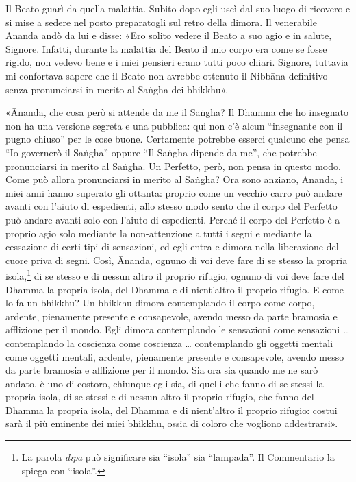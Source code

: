 Il Beato guarì da quella malattia. Subito dopo egli uscì dal suo luogo
di ricovero e si mise a sedere nel posto preparatogli sul retro della
dimora. Il venerabile Ānanda andò da lui e disse: «Ero solito vedere il
Beato a suo agio e in salute, Signore. Infatti, durante la malattia del
Beato il mio corpo era come se fosse rigido, non vedevo bene e i miei
pensieri erano tutti poco chiari. Signore, tuttavia mi confortava sapere
che il Beato non avrebbe ottenuto il Nibbāna definitivo senza
pronunciarsi in merito al Saṅgha dei bhikkhu».


«Ānanda, che cosa però si attende da me il Saṅgha? Il Dhamma che ho
insegnato non ha una versione segreta e una pubblica: qui non c’è alcun
“insegnante con il pugno chiuso” per le cose buone. Certamente potrebbe
esserci qualcuno che pensa “Io governerò il Saṅgha” oppure “Il Saṅgha
dipende da me”, che potrebbe pronunciarsi in merito al Saṅgha. Un
Perfetto, però, non pensa in questo modo. Come può allora pronunciarsi
in merito al Saṅgha? Ora sono anziano, Ānanda, i miei anni hanno
superato gli ottanta: proprio come un vecchio carro può andare avanti
con l’aiuto di espedienti, allo stesso modo sento che il corpo del
Perfetto può andare avanti solo con l’aiuto di espedienti. Perché il
corpo del Perfetto è a proprio agio solo mediante la non-attenzione a
tutti i segni e mediante la cessazione di certi tipi di sensazioni, ed
egli entra e dimora nella liberazione del cuore priva di segni. Così,
Ānanda, ognuno di voi deve fare di se stesso la propria
isola,\footnote{La parola \emph{dīpa} può significare sia “isola” sia “lampada”. Il Commentario la spiega con “isola”.} di se stesso
e di nessun altro il proprio
rifugio, ognuno di voi deve fare del Dhamma la propria isola, del Dhamma
e di nient’altro il proprio rifugio. E come lo fa un bhikkhu? Un bhikkhu
dimora contemplando il corpo come corpo, ardente, pienamente presente e
consapevole, avendo messo da parte bramosia e afflizione per il mondo.
Egli dimora contemplando le sensazioni come sensazioni … contemplando la
coscienza come coscienza … contemplando gli oggetti mentali come oggetti
mentali, ardente, pienamente presente e consapevole, avendo messo da
parte bramosia e afflizione per il mondo. Sia ora sia quando me ne sarò
andato, è uno di costoro, chiunque egli sia, di quelli che fanno di se
stessi la propria isola, di se stessi e di nessun altro il proprio
rifugio, che fanno del Dhamma la propria isola, del Dhamma e di
nient’altro il proprio rifugio: costui sarà il più eminente dei miei
bhikkhu, ossia di coloro che vogliono addestrarsi».


